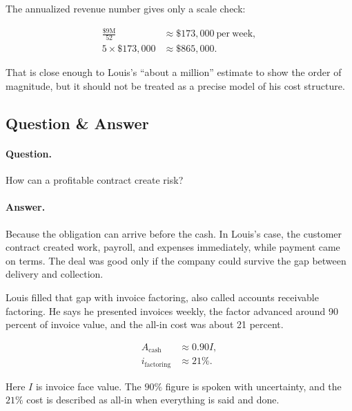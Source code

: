 \documentclass[11pt,oneside]{book}
\begin{document}
The annualized revenue number gives only a scale check:

\begin{align}
\frac{\$9\mathrm{M}}{52}
&\approx
\$173{,}000\ \mathrm{per\ week},\\
5\times \$173{,}000
&\approx
\$865{,}000.
\end{align}

That is close enough to Louis's ``about a million'' estimate to show the order of magnitude, but it should not be treated as a precise model of his cost structure.

\subsection{Question \& Answer}

\paragraph{Question.}
How can a profitable contract create risk?

\paragraph{Answer.}
Because the obligation can arrive before the cash. In Louis's case, the customer contract created work, payroll, and expenses immediately, while payment came on terms. The deal was good only if the company could survive the gap between delivery and collection.

Louis filled that gap with invoice factoring, also called accounts receivable factoring. He says he presented invoices weekly, the factor advanced around 90 percent of invoice value, and the all-in cost was about 21 percent.

\begin{align}
A_{\mathrm{cash}} &\approx 0.90I,\\
i_{\mathrm{factoring}} &\approx 21\%.
\end{align}

Here \(I\) is invoice face value. The \(90\%\) figure is spoken with uncertainty, and the \(21\%\) cost is described as all-in when everything is said and done.
\end{document}
